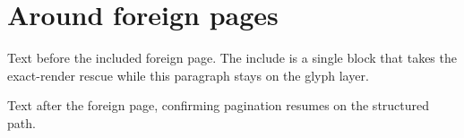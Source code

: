 \documentclass[11pt,a4paper]{article}
\begin{document}
\section{Around foreign pages}

Text before the included foreign page. The include is a single block that
takes the exact-render rescue while this paragraph stays on the glyph
layer.



Text after the foreign page, confirming pagination resumes on the
structured path.
\end{document}
